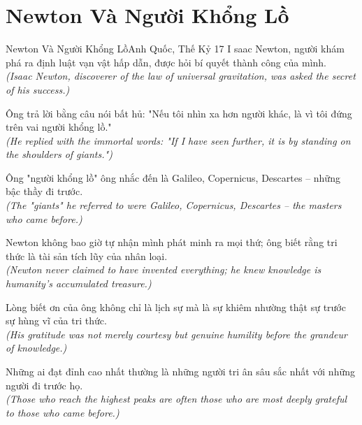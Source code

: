 \section{Newton Và Người Khổng Lồ}
\begin{truyen}{Newton Và Người Khổng Lồ}{Anh Quốc, Thế Kỷ 17}
I saac Newton, người khám phá ra định luật vạn vật hấp dẫn, được hỏi bí quyết thành công của mình.\\
\textit{(Isaac Newton, discoverer of the law of universal gravitation, was asked the secret of his success.)}

Ông trả lời bằng câu nói bất hủ: "Nếu tôi nhìn xa hơn người khác, là vì tôi đứng trên vai người khổng lồ."\\
\textit{(He replied with the immortal words: "If I have seen further, it is by standing on the shoulders of giants.")}

Ông "người khổng lồ" ông nhắc đến là Galileo, Copernicus, Descartes -- những bậc thầy đi trước.\\
\textit{(The "giants" he referred to were Galileo, Copernicus, Descartes -- the masters who came before.)}

Newton không bao giờ tự nhận mình phát minh ra mọi thứ; ông biết rằng tri thức là tài sản tích lũy của nhân loại.\\
\textit{(Newton never claimed to have invented everything; he knew knowledge is humanity's accumulated treasure.)}

Lòng biết ơn của ông không chỉ là lịch sự mà là sự khiêm nhường thật sự trước sự hùng vĩ của tri thức.\\
\textit{(His gratitude was not merely courtesy but genuine humility before the grandeur of knowledge.)}

\end{truyen}
\begin{baihoc}
  Những ai đạt đỉnh cao nhất thường là những người tri ân sâu sắc nhất với những người đi trước họ.\\
  \textit{(Those who reach the highest peaks are often those who are most deeply grateful to those who came before.)}
\end{baihoc}

